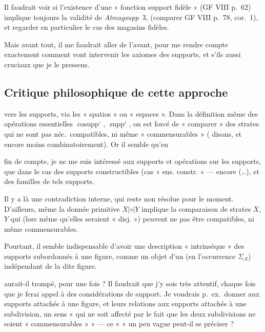 \documentclass[11pt,a4paper]{article}
\begin{document}
Il faudrait voir si l'existence d'une « fonction support  fidèle » (GF VIII p.~62) implique toujours la validité de \textit{Atmagsupp}~3, (comparer GF VIII p.~78, cor.~1), et regarder en particulier le cas des magasins fidèles.

Mais avant tout, il me faudrait aller de l'avant, pour me rendre compte exactement comment vont intervenir les axiomes des supports, et s'ils  \struck{\ill{}} aussi cruciaux que je le pressens.

\subsection*{Critique philosophique de cette approche}

vers les supports, via les « spatios » ou « espaces ». Dans la définition même des opérations essentielles $\operatorname{cosupp}^{\circ}$, $\operatorname{supp}^{\circ}$, on est forcé de « comparer » des strates qui ne sont pas néc.\ compatibles, ni même « commensurables » ( disons, et encore moins combinatoirement). Or il semble qu'en

fin de compte, je ne me suis intéressé aux supports et opérations sur les supports, que dans le cas des supports constructibles (cas « ens. constr. » —  encore (…), et des familles  de tels supports.

Il y a \struck{\ill{}} là une contradiction interne, qui reste non résolue pour le moment. D'ailleurs, même la donnée primitive $X \mathrel{|{\circ}|} Y$ implique la comparaison de strates $X$, $Y$ qui (lors même qu'elles seraient «  disj. ») peuvent ne pas être compatibles, ni même commensurables.

Pourtant, il semble indispensable d'avoir une description « intrinsèque » des supports subordonnés à une figure, comme un objet d'un \ill{} (en l'occurrence $\Sigma_{\mathcal{A}}$) indépendant de la dite figure.  \ill{} 

\struck{\ill{}}aurait-il trompé, pour une fois ? Il faudrait que j'y sois très attentif, chaque fois que je ferai appel à des considérations de support. Je voudrais p.~ex.\ donner aux supports attachés à une figure, et leurs relations aux supports attachés à une subdivision, un sens « qui ne soit affecté par le fait que les deux subdivisions ne soient « commensurables » » — ce «  » un peu vague peut-il se préciser ?
\end{document}
